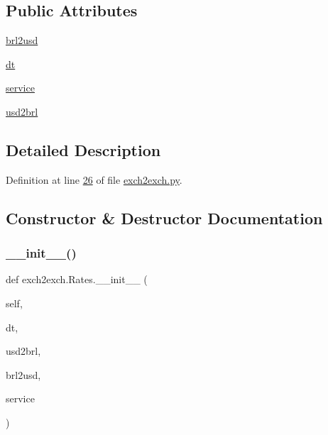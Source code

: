\subsection*{Public Attributes}
\begin{DoxyCompactItemize}
\item 
\hyperlink{classexch2exch_1_1_rates_acc018dea09e825e18e91c73c5c63ab78}{brl2usd}
\item 
\hyperlink{classexch2exch_1_1_rates_acb12f83bce4393714ec30351a1d636c2}{dt}
\item 
\hyperlink{classexch2exch_1_1_rates_a94c1394b9259d6a7c8f3c12bbd20e685}{service}
\item 
\hyperlink{classexch2exch_1_1_rates_ab79ad6e4a42ca358e6b39c825a4b8a0b}{usd2brl}
\end{DoxyCompactItemize}


\subsection{Detailed Description}


Definition at line \hyperlink{exch2exch_8py_source_l00026}{26} of file \hyperlink{exch2exch_8py_source}{exch2exch.\+py}.



\subsection{Constructor \& Destructor Documentation}
\mbox{\label{classexch2exch_1_1_rates_a2868d5631b08e767680f1d0cd0a6420a}} 
\subsubsection{\texorpdfstring{\+\_\+\+\_\+init\+\_\+\+\_\+()}{\_\_init\_\_()}}
{\footnotesize\ttfamily def exch2exch.\+Rates.\+\_\+\+\_\+init\+\_\+\+\_\+ (\begin{DoxyParamCaption}\item[{}]{self,  }\item[{}]{dt,  }\item[{}]{usd2brl,  }\item[{}]{brl2usd,  }\item[{}]{service }\end{DoxyParamCaption})}



